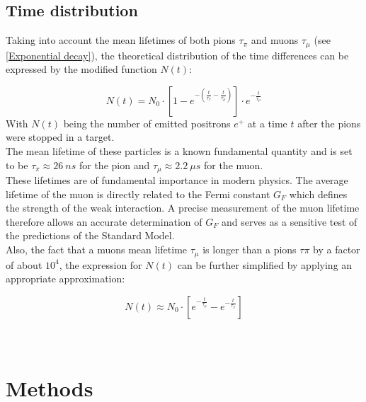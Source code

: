 \documentclass[11pt,a4paper]{article}
\begin{document}
\subsection{Time distribution}
Taking into account the mean lifetimes of both pions $\tau_\pi$ and muons $\tau_\mu$ (see \autoref{Exponential decay}), the theoretical distribution of the time differences can be expressed by the modified function
$N(t)$:

\begin{equation} 
N(t)= N_0 \cdot \left[ 1-e^{-(\frac{t}{\tau_\pi}-\frac{t}{\tau_\mu})}\right]\cdot e^{-\frac{t}{\tau_\mu}} 
\label{time distribution 1}
\end{equation}
With $N(t)$ being the number of emitted positrons $e^+$ at a time $t$ after the pions were stopped in a target.
\\

The mean lifetime of these particles is a known fundamental quantity and is set to be $\tau_\pi\approx \SI{26}{ns}$ for the pion and $\tau_\mu\approx \SI{2.2}{\mu s}$ for the muon.\\
These lifetimes are of fundamental importance in modern physics. The average lifetime of the muon is directly related to the Fermi constant $G_F$ which defines the strength of the weak interaction. A precise measurement of the muon lifetime therefore allows an accurate determination of $G_F$
and serves as a sensitive test of the predictions of the Standard Model.\\

Also, the fact that a muons mean lifetime $\tau_\mu$ is longer than a pions $\tau\pi$ by a factor of about $10^4$, the expression for $N(t)$ can be further simplified by applying an appropriate approximation:

\begin{equation}
N(t)\approx N_0 \cdot \left[    e^{-\frac{t}{\tau_\mu}}-e^{-\frac{t}{\tau_\pi}}\right ]
\label{time distribution 2}
\end{equation}
\\
 \\

\section{Methods}
\end{document}
